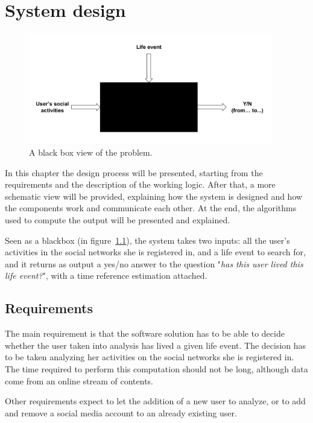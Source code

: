 \chapter{System design}
\label{cha:design}

\begin{figure}
\centering
\includegraphics[width=%
0.95\textwidth]{img/bb}
\caption{A black box view of the problem.}
\label{fig:bb}
\end{figure}

In this chapter the design process will be presented, starting from the requirements and the description of the working logic. After that, a more schematic view will be provided, explaining how the system is designed and how the components work and communicate each other. At the end, the algorithms used to compute the output will be presented and explained.

Seen as a blackbox (in figure~\ref{fig:bb}), the system takes two inputs: all the user's activities in the social networks she is registered in, and a life event to search for, and it returns as output a yes/no answer to the question "\textit{has this user lived this life event?}", with a time reference estimation attached.

\section{Requirements}

The main requirement is that the software solution has to be able to decide whether the user taken into analysis has lived a given life event. The decision has to be taken analyzing her activities on the social networks she is registered in. The time required to perform this computation should not be long, although data come from an online stream of contents.

Other requirements expect to let the addition of a new user to analyze, or to add and remove a social media account to an already existing user.

